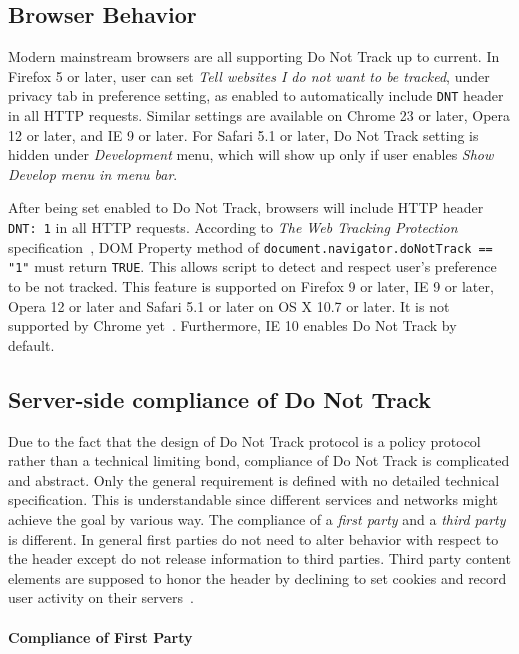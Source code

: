 \documentclass{sig-alternate}
\begin{document}
\subsection*{Browser Behavior} \label{sec:browserbehavior}

Modern mainstream browsers are all supporting Do Not Track up to current. In Firefox 5 or later, user can set \emph{Tell websites I do not want to be tracked}, under privacy tab in preference setting, as enabled to automatically include \texttt{DNT} header in all HTTP requests. Similar settings are available on Chrome 23 or later, Opera 12 or later, and IE 9 or later. For Safari 5.1 or later, Do Not Track setting is hidden under \emph{Development} menu, which will show up only if user enables \emph{Show Develop menu in menu bar}.

After being set enabled to Do Not Track, browsers will include HTTP header \verb|DNT: 1| in all HTTP requests. According to \emph{The Web Tracking Protection} specification~\cite{w3cwtp}, DOM Property method of \verb|document.navigator.doNotTrack == "1"| must return \verb|TRUE|. This allows script to detect and respect user's preference to be not tracked. This feature is supported on Firefox 9 or later, IE 9 or later, Opera 12 or later and Safari 5.1 or later on OS X 10.7 or later. It is not supported by Chrome yet~\cite{navigatordnt}. Furthermore, IE 10 enables Do Not Track by default.~\cite{wikidnt}

\subsection*{Server-side compliance of Do Not Track}

Due to the fact that the design of Do Not Track protocol is a policy protocol rather than a technical limiting bond, compliance of Do Not Track is complicated and abstract. Only the general requirement is defined with no detailed technical specification. This is understandable since different services and networks might achieve the goal by various way. The compliance of a \emph{first party} and a \emph{third party} is different. In general first parties do not need to alter behavior with respect to the header except do not release information to third parties. Third party content elements are supposed to honor the header by declining to set cookies and record user activity on their servers~\cite{donotbeg}.

\paragraph{Compliance of First Party}
\end{document}
